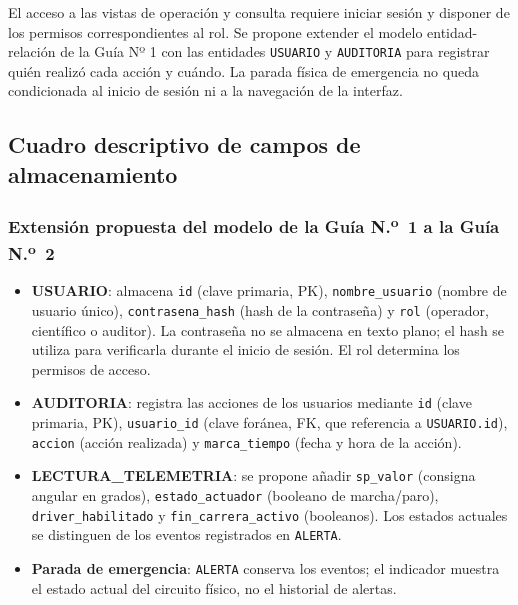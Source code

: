 \documentclass[11pt]{article}
\newcommand{\campo}[1]{\nolinkurl{#1}}
\begin{document}
\begin{enumerate}[leftmargin=1.4em]
\begin{center}
	\end{center}
	
	El acceso a las vistas de operación y consulta requiere iniciar sesión y disponer de los permisos correspondientes al rol. Se propone extender el modelo entidad-relación de la Guía Nº 1 con las entidades \campo{USUARIO} y \campo{AUDITORIA} para registrar quién realizó cada acción y cuándo. La parada física de emergencia no queda condicionada al inicio de sesión ni a la navegación de la interfaz.
	
	\subsection*{Cuadro descriptivo de campos de almacenamiento}
	\label{sec:campos}
	
	\subsubsection*{Extensión propuesta del modelo de la Guía N.\textsuperscript{o}~1 a la Guía N.\textsuperscript{o}~2}
	\begin{itemize}[leftmargin=1.2em, itemsep=1pt]
		\item \textbf{USUARIO}: almacena \campo{id} (clave primaria, PK), \campo{nombre_usuario} (nombre de usuario único), \campo{contrasena_hash} (hash de la contraseña) y \campo{rol} (operador, científico o auditor). La contraseña no se almacena en texto plano; el hash se utiliza para verificarla durante el inicio de sesión. El rol determina los permisos de acceso.
		\item \textbf{AUDITORIA}: registra las acciones de los usuarios mediante \campo{id} (clave primaria, PK), \campo{usuario_id} (clave foránea, FK, que referencia a \campo{USUARIO.id}), \campo{accion} (acción realizada) y \campo{marca_tiempo} (fecha y hora de la acción).
		\item \textbf{LECTURA\_TELEMETRIA}: se propone añadir \campo{sp_valor} (consigna angular en grados), \campo{estado_actuador} (booleano de marcha/paro), \campo{driver_habilitado} y \campo{fin_carrera_activo} (booleanos). Los estados actuales se distinguen de los eventos registrados en \campo{ALERTA}.
		\item \textbf{Parada de emergencia}: \campo{ALERTA} conserva los eventos; el indicador muestra el estado actual del circuito físico, no el historial de alertas.
	\end{itemize}
	

\end{enumerate}
\end{document}
